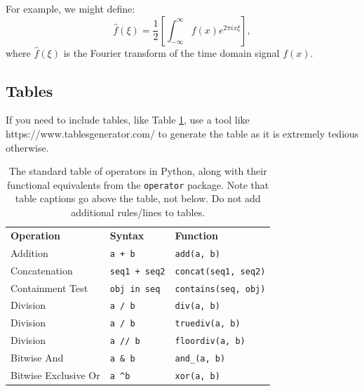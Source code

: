 \documentclass{l4proj}
\begin{document}
For example, we might define:
\begin{equation}
    \hat{f}(\xi) = \frac{1}{2}\left[ \int_{-\infty}^{\infty} f(x) e^{2\pi i x \xi} \right],
\end{equation}    
where $\hat{f}(\xi)$ is the Fourier transform of the time domain signal $f(x)$.

\subsection{Tables}

If you need to include tables, like Table \ref{tab:operators}, use a tool like https://www.tablesgenerator.com/ to generate the table as it is
extremely tedious otherwise. 

\begin{table}[]
    \caption{The standard table of operators in Python, along with their functional equivalents from the \texttt{operator} package. Note that table
    captions go above the table, not below. Do not add additional rules/lines to tables. }\label{tab:operators}
    \begin{tabular}{@{}lll@{}}
    \textbf{Operation}    & \textbf{Syntax}                & \textbf{Function}                            \\ %
    Addition              & \texttt{a + b}                          & \texttt{add(a, b)}                                    \\
    Concatenation         & \texttt{seq1 + seq2}                    & \texttt{concat(seq1, seq2)}                           \\
    Containment Test      & \texttt{obj in seq}                     & \texttt{contains(seq, obj)}                           \\
    Division              & \texttt{a / b}                          & \texttt{div(a, b) }  \\
    Division              & \texttt{a / b}                          & \texttt{truediv(a, b) } \\
    Division              & \texttt{a // b}                         & \texttt{floordiv(a, b)}                               \\
    Bitwise And           & \texttt{a \& b}                         & \texttt{and\_(a, b)}                                  \\
    Bitwise Exclusive Or  & \texttt{a \textasciicircum b}           & \texttt{xor(a, b)}                                    \\

\end{tabular}
\end{table}
\end{document}
